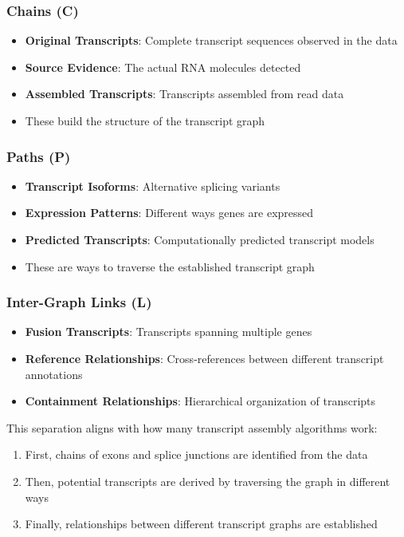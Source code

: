 \documentclass[11pt,a4paper]{article}
\begin{document}
\subsubsection{Chains (C)}

\begin{itemize}[leftmargin=*]
	\item \textbf{Original Transcripts}: Complete transcript sequences observed in the data
	\item \textbf{Source Evidence}: The actual RNA molecules detected
	\item \textbf{Assembled Transcripts}: Transcripts assembled from read data
	\item These build the structure of the transcript graph
\end{itemize}

\subsubsection{Paths (P)}

\begin{itemize}[leftmargin=*]
	\item \textbf{Transcript Isoforms}: Alternative splicing variants
	\item \textbf{Expression Patterns}: Different ways genes are expressed
	\item \textbf{Predicted Transcripts}: Computationally predicted transcript models
	\item These are ways to traverse the established transcript graph
\end{itemize}

\subsubsection{Inter-Graph Links (L)}

\begin{itemize}[leftmargin=*]
	\item \textbf{Fusion Transcripts}: Transcripts spanning multiple genes
	\item \textbf{Reference Relationships}: Cross-references between different transcript annotations
	\item \textbf{Containment Relationships}: Hierarchical organization of transcripts
\end{itemize}

This separation aligns with how many transcript assembly algorithms work:

\begin{enumerate}[leftmargin=*]
	\item First, chains of exons and splice junctions are identified from the data
	\item Then, potential transcripts are derived by traversing the graph in different ways
	\item Finally, relationships between different transcript graphs are established
\end{enumerate}
\end{document}
